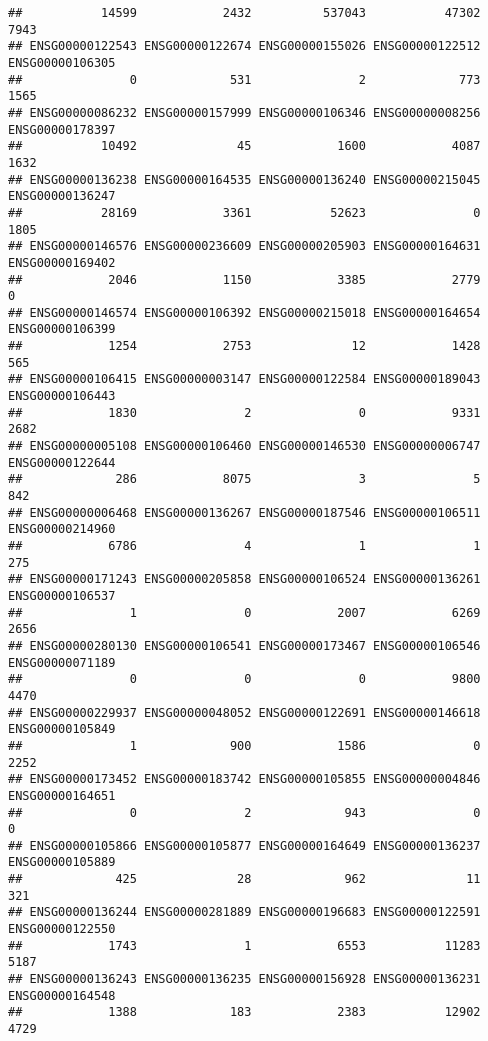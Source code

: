 \documentclass[
]{article}
\begin{document}
\begin{verbatim}
##           14599            2432          537043           47302            7943 
## ENSG00000122543 ENSG00000122674 ENSG00000155026 ENSG00000122512 ENSG00000106305 
##               0             531               2             773            1565 
## ENSG00000086232 ENSG00000157999 ENSG00000106346 ENSG00000008256 ENSG00000178397 
##           10492              45            1600            4087            1632 
## ENSG00000136238 ENSG00000164535 ENSG00000136240 ENSG00000215045 ENSG00000136247 
##           28169            3361           52623               0            1805 
## ENSG00000146576 ENSG00000236609 ENSG00000205903 ENSG00000164631 ENSG00000169402 
##            2046            1150            3385            2779               0 
## ENSG00000146574 ENSG00000106392 ENSG00000215018 ENSG00000164654 ENSG00000106399 
##            1254            2753              12            1428             565 
## ENSG00000106415 ENSG00000003147 ENSG00000122584 ENSG00000189043 ENSG00000106443 
##            1830               2               0            9331            2682 
## ENSG00000005108 ENSG00000106460 ENSG00000146530 ENSG00000006747 ENSG00000122644 
##             286            8075               3               5             842 
## ENSG00000006468 ENSG00000136267 ENSG00000187546 ENSG00000106511 ENSG00000214960 
##            6786               4               1               1             275 
## ENSG00000171243 ENSG00000205858 ENSG00000106524 ENSG00000136261 ENSG00000106537 
##               1               0            2007            6269            2656 
## ENSG00000280130 ENSG00000106541 ENSG00000173467 ENSG00000106546 ENSG00000071189 
##               0               0               0            9800            4470 
## ENSG00000229937 ENSG00000048052 ENSG00000122691 ENSG00000146618 ENSG00000105849 
##               1             900            1586               0            2252 
## ENSG00000173452 ENSG00000183742 ENSG00000105855 ENSG00000004846 ENSG00000164651 
##               0               2             943               0               0 
## ENSG00000105866 ENSG00000105877 ENSG00000164649 ENSG00000136237 ENSG00000105889 
##             425              28             962              11             321 
## ENSG00000136244 ENSG00000281889 ENSG00000196683 ENSG00000122591 ENSG00000122550 
##            1743               1            6553           11283            5187 
## ENSG00000136243 ENSG00000136235 ENSG00000156928 ENSG00000136231 ENSG00000164548 
##            1388             183            2383           12902            4729 

\end{verbatim}
\end{document}

